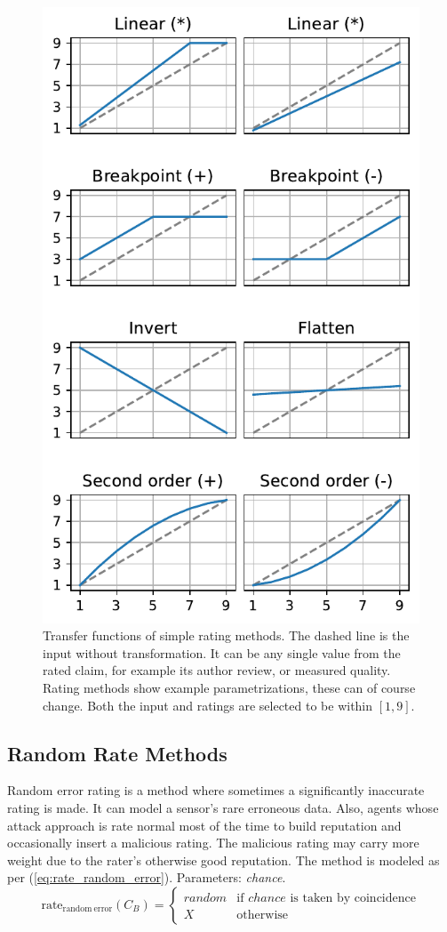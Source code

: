 \documentclass[%
    ]{\PathToTumTemplate/thesis/tum_thesis}
\begin{document}
\begin{figure}[tbp]
  \begin{center}
    \includegraphics[width=0.74\linewidth]{../images/simple_rate_strategies2.pdf}
    \caption{
    Transfer functions of simple rating methods.
    The dashed line is the input without transformation.
    It can be any single value from the rated claim, for example its author review, or measured quality.
    Rating methods show example parametrizations, these can of course change.
    Both the input and ratings are selected to be within $[1,9]$.
    }
    \label{fig:simple_rate_strategies}
  \end{center}
\end{figure}


\subsection{Random Rate Methods}
Random error rating is a method where sometimes a significantly inaccurate rating is made.
	It can model a sensor's rare erroneous data.
Also, agents whose attack approach is rate normal most of the time to build reputation and occasionally insert a malicious rating.
The malicious rating may carry more weight due to the rater's otherwise good reputation.
The method is modeled as per (\ref{eq:rate_random_error}).
Parameters: \emph{chance}.
\begin{equation}\label{eq:rate_random_error}
\mathrm{rate_{random~error}}(C_B) = 
\begin{cases}
random & \text{if $chance$ is taken by coincidence} \\
X & \text{otherwise}
\end{cases}
\end{equation}
\end{document}
